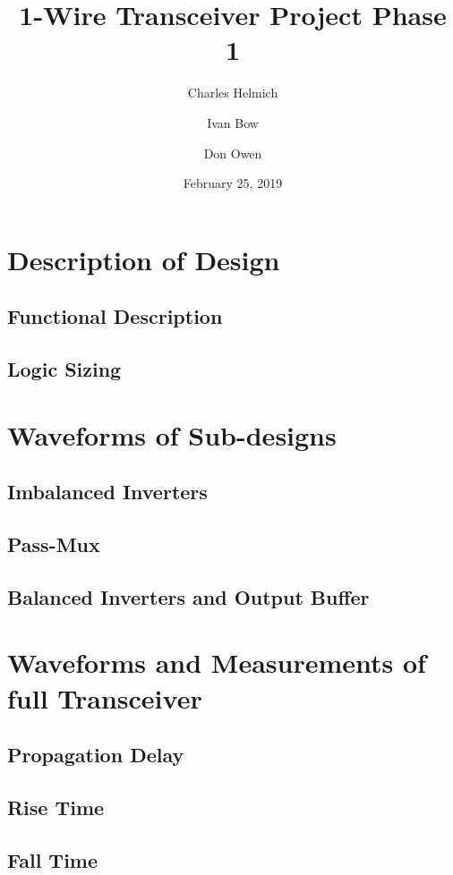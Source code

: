\documentclass[12pt, letterpaper]{article}
\title{1-Wire Transceiver Project Phase 1}
\author{Charles Helmich \and Ivan Bow \and Don Owen}
\date{February 25, 2019}
\begin{document}
\maketitle

\section{Description of Design}
\subsection{Functional Description}
\subsection{Logic Sizing}

\section{Waveforms of Sub-designs}
\subsection{Imbalanced Inverters}
\subsection{Pass-Mux}
\subsection{Balanced Inverters and Output Buffer}

\section{Waveforms and Measurements of full Transceiver}
\subsection{Propagation Delay}
\subsection{Rise Time}
\subsection{Fall Time}
\end{document}

